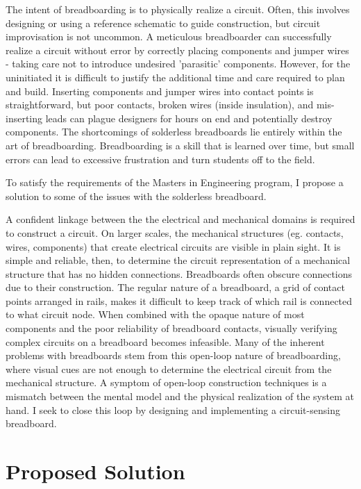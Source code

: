 The intent of breadboarding is to physically realize a circuit.
Often, this involves designing or using a reference schematic to guide construction, but circuit improvisation is not uncommon.  
A meticulous breadboarder can successfully realize a circuit without error by correctly placing components and jumper wires - taking care not to introduce undesired 'parasitic' components.  
However, for the uninitiated it is difficult to justify the additional time and care required to plan and build.
Inserting components and jumper wires into contact points is straightforward, but poor contacts, broken wires (inside insulation), and mis-inserting leads can plague designers for hours on end and potentially destroy components.
The shortcomings of solderless breadboards lie entirely within the art of breadboarding.
Breadboarding is a skill that is learned over time, but small errors can lead to excessive frustration and turn students off to the field.

To satisfy the requirements of the Masters in Engineering program, I propose a solution to some of the issues with the solderless breadboard.

A confident linkage between the the electrical and mechanical domains is required to construct a circuit.
On larger scales, the mechanical structures (eg. contacts, wires, components) that create electrical circuits are visible in plain sight.
It is simple and reliable, then, to determine the circuit representation of a mechanical structure that has no hidden connections.
Breadboards often obscure connections due to their construction.
The regular nature of a breadboard, a grid of contact points arranged in rails, makes it difficult to keep track of which rail is connected to what circuit node.
When combined with the opaque nature of most components and the poor reliability of breadboard contacts, visually verifying complex circuits on a breadboard becomes infeasible.
Many of the inherent problems with breadboards stem from this open-loop nature of breadboarding, where visual cues are not enough to determine the electrical circuit from the mechanical structure.
A symptom of open-loop construction techniques is a mismatch between the mental model and the physical realization of the system at hand.
I seek to close this loop by designing and implementing a circuit-sensing breadboard.

\section{Proposed Solution}

